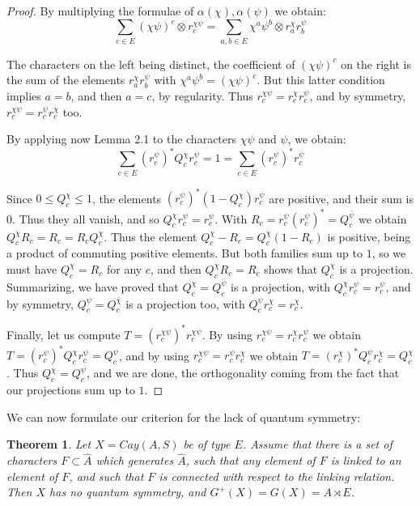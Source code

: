\documentclass[11pt]{amsart}
\newtheorem{theorem}{Theorem}[section]
\newcommand{\hA}{\widehat A}
\newcommand{\bchi}{\bar\chi}
\newcommand{\bpsi}{\bar\psi}
\begin{document}
\begin{proof}
By multiplying the formulae of $\alpha(\chi),\alpha(\psi)$ we obtain:
$$\sum_{c\in E}(\chi\psi)^c\otimes r^{\chi\psi}_c=\sum_{a,b\in E}\chi^a\psi^b\otimes r^\chi_ar^\psi_b$$

The characters on the left being distinct, the coefficient of $(\chi\psi)^c$ on the right is the sum of the elements $r^\chi_ar^\psi_b$ with $\chi^a\psi^b=(\chi\psi)^c$. But this latter condition implies $a=b$, and then $a=c$, by regularity. Thus $r^{\chi\psi}_c=r^\chi_cr^\psi_c$, and by symmetry, $r^{\chi\psi}_c=r^\psi_cr^\chi_c$ too.

By applying now Lemma 2.1 to the characters $\chi\psi$ and $\psi$, we obtain:
$$\sum_{c\in E}(r^\psi_c)^*Q^\chi_cr^\psi_c=1=\sum_{c\in E}(r^\psi_c)^*r^\psi_c$$

Since $0\leq Q^\chi_c\leq1$, the elements $(r^\psi_c)^*(1-Q^\chi_c)r^\psi_c$ are positive, and their sum is $0$. Thus they all vanish, and so $Q^\chi_cr^\psi_c=r^\psi_c$. With $R_c=r^\psi_c(r^\psi_c)^*=Q^{\bpsi}_c$ we obtain $Q^\chi_cR_c=R_c=R_cQ^\chi_c$. Thus the element $Q^\chi_c-R_c=Q^\chi_c(1-R_c)$ is positive, being a product of commuting positive elements. But both families sum up to $1$, so we must have $Q^\chi_c=R_c$ for any $c$, and then $Q^\chi_cR_c=R_c$ shows that $Q^\chi_c$ is a projection. Summarizing, we have proved that $Q^\chi_c=Q^{\bpsi}_c$ is a projection, with $Q^\chi_cr^\psi_c=r^\psi_c$, and by symmetry, $Q^\psi_c=Q^{\bchi}_c$ is a projection too, with $Q^\psi_cr^\chi_c=r^\chi_c$.

Finally, let us compute $T=(r^{\chi\psi}_c)^*r^{\chi\psi}_c$. By using $r^{\chi\psi}_c=r^\chi_cr^\psi_c$ we obtain $T=(r^\psi_c)^*Q^\chi_cr^\psi_c=Q^\psi_c$, and by using $r^{\chi\psi}_c=r^\psi_cr^\chi_c$ we obtain $T=(r^\chi_c)^*Q^\psi_cr^\chi_c=Q^\chi_c$. Thus $Q^\chi_c=Q^\psi_c$, and we are done, the orthogonality coming from the fact that our projections sum up to $1$.
\end{proof}

We can now formulate our criterion for the lack of quantum symmetry:

\begin{theorem}
Let $X=Cay(A,S)$ be of type $E$. Assume that there is a set of characters $F\subset\hA$ which generates $\hA$, such that any element of $F$ is linked to an element of $F$, and such that $F$ is connected with respect to the linking relation. Then $X$ has no quantum symmetry, and $G^+(X)=G(X)=A\rtimes E$.
\end{theorem}
\end{document}
